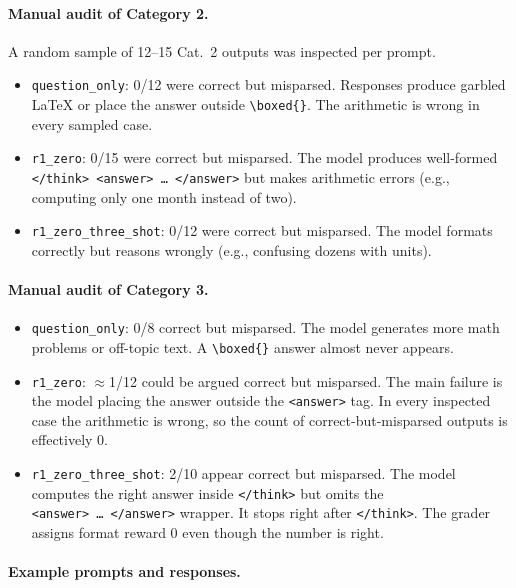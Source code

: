 \documentclass[11pt]{article}
\begin{document}
\paragraph{Manual audit of Category 2.}
A random sample of 12--15 Cat.~2 outputs was inspected per prompt.
\begin{itemize}
  \item \texttt{question\_only}: 0/12 were correct but misparsed. Responses
    produce garbled LaTeX or place the answer outside \verb|\boxed{}|.
    The arithmetic is wrong in every sampled case.
  \item \texttt{r1\_zero}: 0/15 were correct but misparsed. The model
    produces well-formed \texttt{</think>~<answer>~\ldots~</answer>} but
    makes arithmetic errors (e.g., computing only one month instead of two).
  \item \texttt{r1\_zero\_three\_shot}: 0/12 were correct but misparsed.
    The model formats correctly but reasons wrongly (e.g., confusing
    dozens with units).
\end{itemize}

\paragraph{Manual audit of Category 3.}
\begin{itemize}
  \item \texttt{question\_only}: 0/8 correct but misparsed. The model
    generates more math problems or off-topic text. A \verb|\boxed{}| answer
    almost never appears.
  \item \texttt{r1\_zero}: $\approx$1/12 could be argued correct but misparsed.
    The main failure is the model placing the answer outside the
    \texttt{<answer>} tag. In every inspected case the arithmetic is wrong,
    so the count of correct-but-misparsed outputs is effectively 0.
  \item \texttt{r1\_zero\_three\_shot}: 2/10 appear correct but misparsed.
    The model computes the right answer inside \texttt{</think>} but omits the
    \texttt{<answer>~\ldots~</answer>} wrapper. It stops right after
    \texttt{</think>}. The grader assigns format reward 0 even though
    the number is right.
\end{itemize}

\paragraph{Example prompts and responses.}
\end{document}
